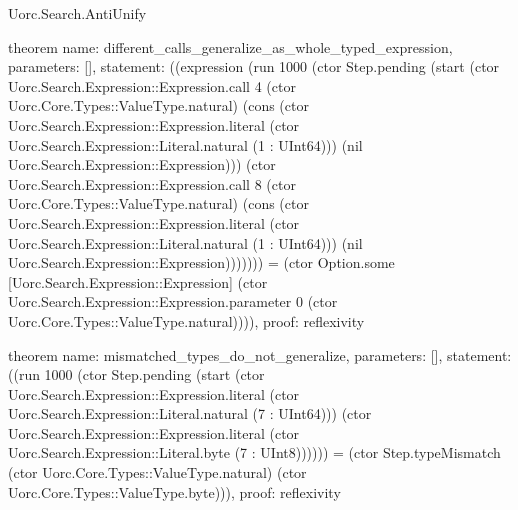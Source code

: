 \begin{lexlean}{Uorc.Search.AntiUnify}
\begin{semanticmodule}
theorem{
  name: different_calls_generalize_as_whole_typed_expression,
  parameters: [],
  statement: ((expression (run 1000 (ctor Step.pending (start (ctor Uorc.Search.Expression::Expression.call 4 (ctor Uorc.Core.Types::ValueType.natural) (cons (ctor Uorc.Search.Expression::Expression.literal (ctor Uorc.Search.Expression::Literal.natural (1 : UInt64))) (nil Uorc.Search.Expression::Expression))) (ctor Uorc.Search.Expression::Expression.call 8 (ctor Uorc.Core.Types::ValueType.natural) (cons (ctor Uorc.Search.Expression::Expression.literal (ctor Uorc.Search.Expression::Literal.natural (1 : UInt64))) (nil Uorc.Search.Expression::Expression))))))) = (ctor Option.some [Uorc.Search.Expression::Expression] (ctor Uorc.Search.Expression::Expression.parameter 0 (ctor Uorc.Core.Types::ValueType.natural)))),
  proof: reflexivity{}
}

theorem{
  name: mismatched_types_do_not_generalize,
  parameters: [],
  statement: ((run 1000 (ctor Step.pending (start (ctor Uorc.Search.Expression::Expression.literal (ctor Uorc.Search.Expression::Literal.natural (7 : UInt64))) (ctor Uorc.Search.Expression::Expression.literal (ctor Uorc.Search.Expression::Literal.byte (7 : UInt8)))))) = (ctor Step.typeMismatch (ctor Uorc.Core.Types::ValueType.natural) (ctor Uorc.Core.Types::ValueType.byte))),
  proof: reflexivity{}
}
\end{semanticmodule}
\end{lexlean}
